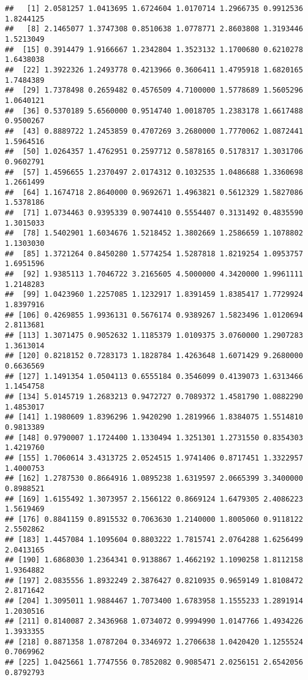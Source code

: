 \documentclass[
]{article}
\begin{document}
\begin{verbatim}
##   [1] 2.0581257 1.0413695 1.6724604 1.0170714 1.2966735 0.9912536 1.8244125
##   [8] 2.1465077 1.3747308 0.8510638 1.0778771 2.8603808 1.3193446 1.5213049
##  [15] 0.3914479 1.9166667 1.2342804 1.3523132 1.1700680 0.6210278 1.6438038
##  [22] 1.3922326 1.2493778 0.4213966 0.3606411 1.4795918 1.6820165 1.7484389
##  [29] 1.7378498 0.2659482 0.4576509 4.7100000 1.5778689 1.5605296 1.0640121
##  [36] 0.5370189 5.6560000 0.9514740 1.0018705 1.2383178 1.6617488 0.9500267
##  [43] 0.8889722 1.2453859 0.4707269 3.2680000 1.7770062 1.0872441 1.5964516
##  [50] 1.0264357 1.4762951 0.2597712 0.5878165 0.5178317 1.3031706 0.9602791
##  [57] 1.4596655 1.2370497 2.0174312 0.1032535 1.0486688 1.3360698 1.2661499
##  [64] 1.1674718 2.8640000 0.9692671 1.4963821 0.5612329 1.5827086 1.5378186
##  [71] 1.0734463 0.9395339 0.9074410 0.5554407 0.3131492 0.4835590 1.3015033
##  [78] 1.5402901 1.6034676 1.5218452 1.3802669 1.2586659 1.1078802 1.1303030
##  [85] 1.3721264 0.8450280 1.5774254 1.5287818 1.8219254 1.0953757 1.6951596
##  [92] 1.9385113 1.7046722 3.2165605 4.5000000 4.3420000 1.9961111 1.2148283
##  [99] 1.0423960 1.2257085 1.1232917 1.8391459 1.8385417 1.7729924 1.8397916
## [106] 0.4269855 1.9936131 0.5676174 0.9389267 1.5823496 1.0120694 2.8113681
## [113] 1.3071475 0.9052632 1.1185379 1.0109375 3.0760000 1.2907283 1.3613014
## [120] 0.8218152 0.7283173 1.1828784 1.4263648 1.6071429 9.2680000 0.6636569
## [127] 1.1491354 1.0504113 0.6555184 0.3546099 0.4139073 1.6313466 1.1454758
## [134] 5.0145719 1.2683213 0.9472727 0.7089372 1.4581790 1.0882290 1.4853017
## [141] 1.1980609 1.8396296 1.9420290 1.2819966 1.8384075 1.5514810 0.9813389
## [148] 0.9790007 1.1724400 1.1330494 1.3251301 1.2731550 0.8354303 1.4219760
## [155] 1.7060614 3.4313725 2.0524515 1.9741406 0.8717451 1.3322957 1.4000753
## [162] 1.2787530 0.8664916 1.0895238 1.6319597 2.0665399 3.3400000 0.8988521
## [169] 1.6155492 1.3073957 2.1566122 0.8669124 1.6479305 2.4086223 1.5619469
## [176] 0.8841159 0.8915532 0.7063630 1.2140000 1.8005060 0.9118122 2.5502862
## [183] 1.4457084 1.1095604 0.8803222 1.7815741 2.0764288 1.6256499 2.0413165
## [190] 1.6868030 1.2364341 0.9138867 1.4662192 1.1090258 1.8112158 1.9364882
## [197] 2.0835556 1.8932249 2.3876427 0.8210935 0.9659149 1.8108472 2.8171642
## [204] 1.3095011 1.9884467 1.7073400 1.6783958 1.1555233 1.2891914 1.2030516
## [211] 0.8140087 2.3436968 1.0734072 0.9994990 1.0147766 1.4934226 1.3933355
## [218] 0.8871358 1.0787204 0.3346972 1.2706638 1.0420420 1.1255524 0.7069962
## [225] 1.0425661 1.7747556 0.7852082 0.9085471 2.0256151 2.6542056 0.8792793

\end{verbatim}
\end{document}
